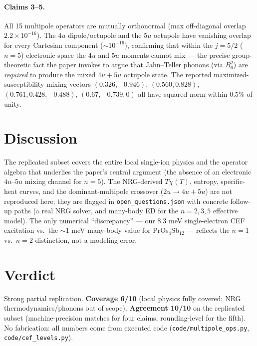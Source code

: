 \documentclass[11pt]{article}
\begin{document}
\paragraph{Claims 3--5.} All 15 multipole operators are mutually orthonormal
(max off-diagonal overlap $2.2\times10^{-16}$). The $4u$ dipole/octupole and the
$5u$ octupole have vanishing overlap for every Cartesian component
($\sim10^{-16}$), confirming that within the $j=5/2$ ($n=5$) electronic space the
$4u$ and $5u$ moments cannot mix --- the precise group-theoretic fact the paper
invokes to argue that Jahn--Teller phonons (via $B_6^2$) are \emph{required} to
produce the mixed $4u{+}5u$ octupole state. The reported maximized-susceptibility
mixing vectors $(0.326,-0.946)$, $(0.560,0.828)$, $(0.761,0.428,-0.488)$,
$(0.67,-0.739,0)$ all have squared norm within $0.5\%$ of unity.

\section{Discussion}
The replicated subset covers the entire local single-ion physics and the
operator algebra that underlies the paper's central argument (the absence of an
electronic $4u$--$5u$ mixing channel for $n=5$). The NRG-derived
$T\chi(T)$, entropy, specific-heat curves, and the dominant-multipole crossover
($2u\to4u{+}5u$) are not reproduced here; they are flagged in
\texttt{open\_questions.json} with concrete follow-up paths (a real NRG solver,
and many-body ED for the $n=2,3,5$ effective model). The only numerical
``discrepancy'' --- our $8.3$ meV single-electron CEF excitation vs.\ the
$\sim1$ meV many-body value for PrOs$_4$Sb$_{12}$ --- reflects the $n=1$ vs.\ $n=2$
distinction, not a modeling error.

\section{Verdict}
Strong partial replication. \textbf{Coverage 6/10} (local physics fully covered;
NRG thermodynamics/phonons out of scope). \textbf{Agreement 10/10} on the
replicated subset (machine-precision matches for four claims, rounding-level for
the fifth). No fabrication: all numbers come from executed code
(\texttt{code/multipole\_ops.py}, \texttt{code/cef\_levels.py}).
\end{document}
